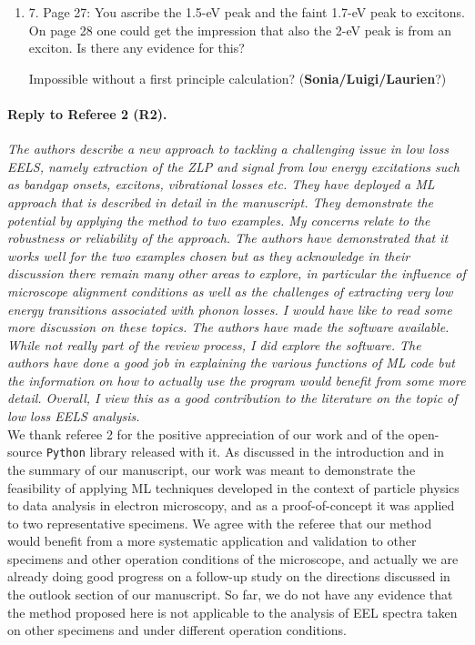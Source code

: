 \documentclass[12pt]{article}
\begin{document}
\begin{enumerate}
\item{  7.	Page 27: You ascribe the 1.5-eV peak and the faint 1.7-eV peak to excitons. On page 28 one could get the impression that also the 2-eV peak is from an exciton. Is there any evidence for this? }

  Impossible without a first principle calculation? ({\bf Sonia/Luigi/Laurien}?)
    
    
\end{enumerate}

\paragraph{Reply to Referee 2 (R2).}

{\it  The authors describe a new approach to tackling a challenging issue in low loss EELS, namely extraction of the ZLP and signal from low energy excitations such as bandgap onsets, excitons, vibrational losses etc.  They have deployed a ML approach that is described in detail in the manuscript.  They demonstrate the potential by applying the method to two examples.  My concerns relate to the robustness or reliability of the approach.  The authors have demonstrated that it works well for the two examples chosen but as they acknowledge in their discussion there remain many other areas to explore, in particular the influence of microscope alignment conditions as well as the challenges of extracting very low energy transitions associated with phonon losses. I would have like to read some more discussion on these topics.  The authors have made the software available.  While not really part of the review process, I did explore the software.  The authors have done a good
    job in explaining the various functions of ML code but the information on how to actually use the program would benefit from some more detail.  Overall, I view this as a good contribution to the literature on the topic of low loss EELS analysis.}\\

We thank referee 2 for the positive
appreciation of our work and of the open-source {\tt Python} library released with
it. As discussed in the introduction and in the summary of our manuscript, our work was meant to demonstrate the feasibility of applying ML techniques developed
in the context of particle physics to data analysis in electron microscopy, and as a proof-of-concept
it was applied to two representative specimens.
%
We agree with the referee that our method would benefit from a more systematic application
and validation to other specimens and other operation conditions of the microscope, and actually
we are already doing good progress on a follow-up study on the directions discussed in the
outlook section of our manuscript.
%
So far, we do not have any evidence that the method proposed here is not applicable to the analysis
of EEL spectra taken on other specimens and under different operation conditions.
\end{document}
